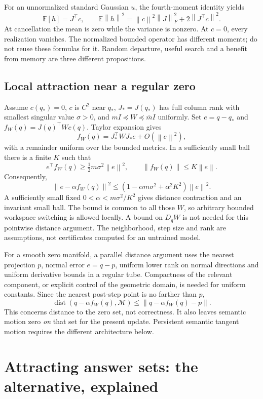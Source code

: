 \documentclass[11pt,a4paper]{article}
\newcommand{\norm}[1]{\left\lVert #1\right\rVert}
\newcommand{\newtopic}{\clearpage}
\begin{document}
For an unnormalized standard Gaussian $u$, the fourth-moment identity yields
\[
\mathbb E[h]=J^\top c,\qquad
\mathbb E\norm{h}^2=\norm{c}^2\norm{J}_F^2+2\norm{J^\top c}^2.
\]
At cancellation the mean is zero while the variance is nonzero. At $c=0$, every realization vanishes. The normalized bounded operator has different moments; do not reuse these formulas for it. Random departure, useful search and a benefit from memory are three different propositions.

\subsection{Local attraction near a regular zero}\label{app:local}
Assume $c(q_*)=0$, $c$ is $C^2$ near $q_*$, $J_*=J(q_*)$ has full column rank with smallest singular value $\sigma>0$, and $mI\preceq W\preceq\bar mI$ uniformly. Set $e=q-q_*$ and $f_W(q)=J(q)^\top Wc(q)$. Taylor expansion gives
\[
f_W(q)=J_*^\top WJ_*e+O(\norm{e}^2),
\]
with a remainder uniform over the bounded metrics. In a sufficiently small ball there is a finite $K$ such that
\[
e^\top f_W(q)\ge\tfrac12m\sigma^2\norm{e}^2,
\qquad \norm{f_W(q)}\le K\norm{e}.
\]
Consequently,
\[
\norm{e-\alpha f_W(q)}^2
\le(1-\alpha m\sigma^2+\alpha^2K^2)\norm{e}^2.
\]
A sufficiently small fixed $0<\alpha<m\sigma^2/K^2$ gives distance contraction and an invariant small ball. The bound is common to all those $W$, so arbitrary bounded workspace switching is allowed locally. A bound on $D_qW$ is not needed for this pointwise distance argument. The neighborhood, step size and rank are assumptions, not certificates computed for an untrained model.

For a smooth zero manifold, a parallel distance argument uses the nearest projection $p$, normal error $e=q-p$, uniform lower rank on normal directions and uniform derivative bounds in a regular tube. Compactness of the relevant component, or explicit control of the geometric domain, is needed for uniform constants. Since the nearest post-step point is no farther than $p$,
\[
\operatorname{dist}(q-\alpha f_W(q),\mathcal M)
\le\norm{q-\alpha f_W(q)-p}.
\]
This concerns distance to the zero set, not correctness. It also leaves semantic motion zero \emph{on} that set for the present update. Persistent semantic tangent motion requires the different architecture below.

\newtopic
\section{Attracting answer sets: the alternative, explained}\label{app:sets}
\end{document}
